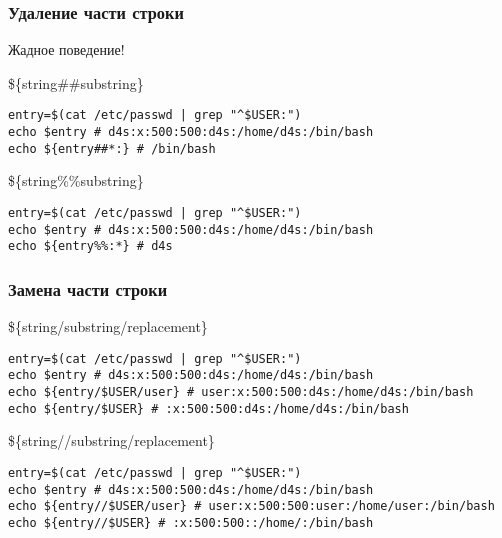 \begin{frame}[fragile]
	\frametitle{Удаление части строки}

	\large{Жадное поведение!}

	\begin{block}{\$\{string\#\#substring\}}
	\begin{lstlisting}
entry=$(cat /etc/passwd | grep "^$USER:")
echo $entry # d4s:x:500:500:d4s:/home/d4s:/bin/bash
echo ${entry##*:} # /bin/bash
	\end{lstlisting}
	\end{block}
	\pause
	\begin{block}{\$\{string\%\%substring\}}
	\begin{lstlisting}
entry=$(cat /etc/passwd | grep "^$USER:")
echo $entry # d4s:x:500:500:d4s:/home/d4s:/bin/bash
echo ${entry%%:*} # d4s
	\end{lstlisting}
	\end{block}
\end{frame}


\begin{frame}[fragile]
	\frametitle{Замена части строки}

	\begin{block}{\$\{string/substring/replacement\}}
	\begin{lstlisting}
entry=$(cat /etc/passwd | grep "^$USER:")
echo $entry # d4s:x:500:500:d4s:/home/d4s:/bin/bash
echo ${entry/$USER/user} # user:x:500:500:d4s:/home/d4s:/bin/bash
echo ${entry/$USER} # :x:500:500:d4s:/home/d4s:/bin/bash
	\end{lstlisting}
	\end{block}

	\pause
	\begin{block}{\$\{string//substring/replacement\}}
	\begin{lstlisting}
entry=$(cat /etc/passwd | grep "^$USER:")
echo $entry # d4s:x:500:500:d4s:/home/d4s:/bin/bash
echo ${entry//$USER/user} # user:x:500:500:user:/home/user:/bin/bash
echo ${entry//$USER} # :x:500:500::/home/:/bin/bash
	\end{lstlisting}
	\end{block}

\end{frame}

